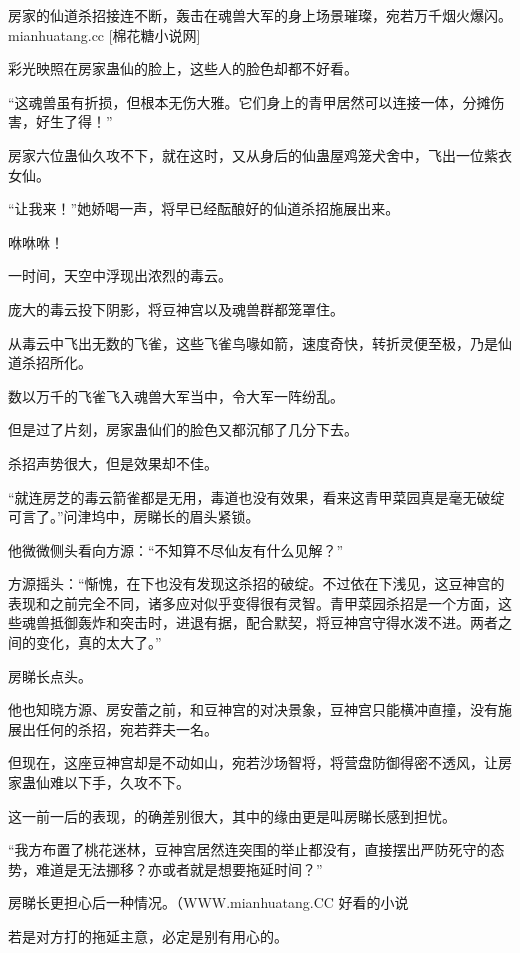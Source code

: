 
\begin{this_body}

房家的仙道杀招接连不断，轰击在魂兽大军的身上场景璀璨，宛若万千烟火爆闪。mianhuatang.cc [棉花糖小说网]

彩光映照在房家蛊仙的脸上，这些人的脸色却都不好看。

“这魂兽虽有折损，但根本无伤大雅。它们身上的青甲居然可以连接一体，分摊伤害，好生了得！”

房家六位蛊仙久攻不下，就在这时，又从身后的仙蛊屋鸡笼犬舍中，飞出一位紫衣女仙。

“让我来！”她娇喝一声，将早已经酝酿好的仙道杀招施展出来。

咻咻咻！

一时间，天空中浮现出浓烈的毒云。

庞大的毒云投下阴影，将豆神宫以及魂兽群都笼罩住。

从毒云中飞出无数的飞雀，这些飞雀鸟喙如箭，速度奇快，转折灵便至极，乃是仙道杀招所化。

数以万千的飞雀飞入魂兽大军当中，令大军一阵纷乱。

但是过了片刻，房家蛊仙们的脸色又都沉郁了几分下去。

杀招声势很大，但是效果却不佳。

“就连房芝的毒云箭雀都是无用，毒道也没有效果，看来这青甲菜园真是毫无破绽可言了。”问津坞中，房睇长的眉头紧锁。

他微微侧头看向方源：“不知算不尽仙友有什么见解？”

方源摇头：“惭愧，在下也没有发现这杀招的破绽。不过依在下浅见，这豆神宫的表现和之前完全不同，诸多应对似乎变得很有灵智。青甲菜园杀招是一个方面，这些魂兽抵御轰炸和突击时，进退有据，配合默契，将豆神宫守得水泼不进。两者之间的变化，真的太大了。”

房睇长点头。

他也知晓方源、房安蕾之前，和豆神宫的对决景象，豆神宫只能横冲直撞，没有施展出任何的杀招，宛若莽夫一名。

但现在，这座豆神宫却是不动如山，宛若沙场智将，将营盘防御得密不透风，让房家蛊仙难以下手，久攻不下。

这一前一后的表现，的确差别很大，其中的缘由更是叫房睇长感到担忧。

“我方布置了桃花迷林，豆神宫居然连突围的举止都没有，直接摆出严防死守的态势，难道是无法挪移？亦或者就是想要拖延时间？”

房睇长更担心后一种情况。（WWW.mianhuatang.CC 好看的小说

若是对方打的拖延主意，必定是别有用心的。


\end{this_body}
